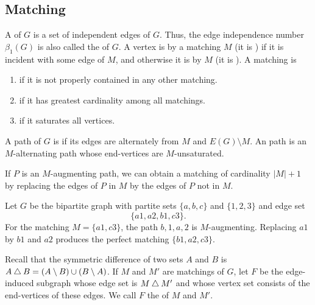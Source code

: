 \subsection{Matching}\label{subsec:Matching}

A  of $G$ is a set of independent edges of $G$. Thus, the edge independence number $\beta_1(G)$ is also called the  of $G$. A vertex is  by a matching $M$ (it is ) if it is incident with some edge of $M$, and otherwise it is  by $M$ (it is ). A matching is
\begin{enumerate}[label=(\roman*)]
\item {} if it is not properly contained in any other matching.
\item {} if it has greatest cardinality among all matchings.
\item {} if it saturates all vertices.
\end{enumerate}

A path of $G$ is  if its edges are alternately from $M$ and $E(G) \setminus M$. An  path is an $M$-alternating path whose end-vertices are $M$-unsaturated.

\begin{Note*}
If $P$ is an $M$-augmenting path, we can obtain a matching of cardinality $|M| + 1$ by replacing the edges of $P$ in $M$ by the edges of $P$ not in $M$.
\end{Note*}

\begin{Example}\label{ex:AugmentingPath}
Let $G$ be the bipartite graph with partite sets $\{a,b,c\}$ and $\{1,2,3\}$ and edge set
\begin{equation*}
\{a1,a2,b1,c3\}.
\end{equation*}
For the matching $M=\{a1,c3\}$, the path $b,1,a,2$ is $M$-augmenting. Replacing $a1$ by $b1$ and $a2$ produces the perfect matching $\{b1,a2,c3\}$.
\end{Example}

Recall that the symmetric difference of two sets $A$ and $B$ is $A \mathbin{\triangle} B = (A \setminus B) \cup (B \setminus A)$. If $M$ and $M'$ are matchings of $G$, let $F$ be the edge-induced subgraph whose edge set is $M \mathbin{\triangle} M'$ and whose vertex set consists of the end-vertices of these edges. We call $F$ the  of $M$ and $M'$.

